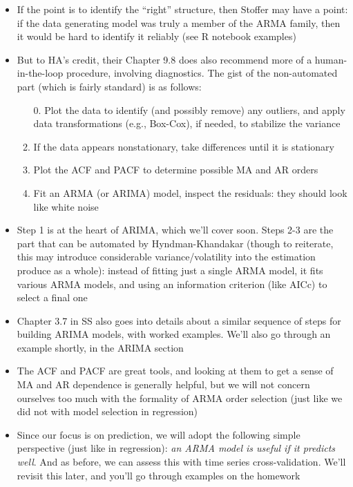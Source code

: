 \documentclass{article}
\begin{document}
\begin{itemize}
\item If the point is to identify the ``right'' structure, then Stoffer may have
  a point: if the data generating model was truly a member of the ARMA family,
  then it would be hard to identify it reliably (see R notebook examples)

\item But to HA's credit, their Chapter 9.8 does also recommend more of a
  human-in-the-loop procedure, involving diagnostics. The gist of the
  non-automated part (which is fairly standard) is as follows: 
  \begin{enumerate}
  \item[0.] Plot the data to identify (and possibly remove) any outliers, and 
   apply data transformations (e.g., Box-Cox), if needed, to stabilize the  
   variance   
  \item If the data appears nonstationary, take differences until it is
    stationary 
  \item Plot the ACF and PACF to determine possible MA and AR orders 
  \item Fit an ARMA (or ARIMA) model, inspect the residuals: they should look
    like  white noise  
  \end{enumerate}

\item Step 1 is at the heart of ARIMA, which we'll cover soon. Steps 2-3 are the 
  part that can be automated by Hyndman-Khandakar (though to reiterate, this 
  may introduce considerable variance/volatility into the estimation produce as
  a whole): instead of fitting just a single ARMA model, it fits various ARMA
  models, and using an information criterion (like AICc) to select a final one       

\item Chapter 3.7 in SS also goes into details about a similar sequence of steps
  for building ARIMA models, with worked examples. We'll also go through an
  example shortly, in the ARIMA section   

\item The ACF and PACF are great tools, and looking at them to get a sense of MA
  and AR dependence is generally helpful, but we will not concern ourselves too
  much with the formality of ARMA order selection (just like we did not with
  model selection in regression) 

\item Since our focus is on prediction, we will adopt the following simple
  perspective (just like in regression): \emph{an ARMA model is useful if it
    predicts well}. And as before, we can assess this with time series
  cross-validation. We'll revisit this later, and you'll go through examples on
  the homework 
\end{itemize}
\end{document}
